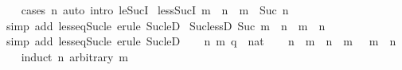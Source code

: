 \begin{isabellebody}
%
\isadelimproof
\ \ %
\endisadelimproof
%
\isatagproof
{}\isamarkupfalse%
\ {\isacharparenleft}{\kern0pt}cases\ n{\isacharparenright}{\kern0pt}\ {\isacharparenleft}{\kern0pt}auto\ intro{\isacharcolon}{\kern0pt}\ le{\isacharunderscore}{\kern0pt}SucI{\isacharparenright}{\kern0pt}%
\endisatagproof
{\isafoldproof}%
%
\isadelimproof
\isanewline
%
\endisadelimproof
\isanewline
{}\isamarkupfalse%
\ less{\isacharunderscore}{\kern0pt}SucI{\isacharcolon}{\kern0pt}\ {\isachardoublequoteopen}m\ {\isacharless}{\kern0pt}\ n\ {\isasymLongrightarrow}\ m\ {\isacharless}{\kern0pt}\ Suc\ n{\isachardoublequoteclose}\isanewline
%
\isadelimproof
\ \ %
\endisadelimproof
%
\isatagproof
{}\isamarkupfalse%
\ {\isacharparenleft}{\kern0pt}simp\ add{\isacharcolon}{\kern0pt}\ less{\isacharunderscore}{\kern0pt}eq{\isacharunderscore}{\kern0pt}Suc{\isacharunderscore}{\kern0pt}le{\isacharparenright}{\kern0pt}\ {\isacharparenleft}{\kern0pt}erule\ Suc{\isacharunderscore}{\kern0pt}leD{\isacharparenright}{\kern0pt}%
\endisatagproof
{\isafoldproof}%
%
\isadelimproof
\isanewline
%
\endisadelimproof
\isanewline
{}\isamarkupfalse%
\ Suc{\isacharunderscore}{\kern0pt}lessD{\isacharcolon}{\kern0pt}\ {\isachardoublequoteopen}Suc\ m\ {\isacharless}{\kern0pt}\ n\ {\isasymLongrightarrow}\ m\ {\isacharless}{\kern0pt}\ n{\isachardoublequoteclose}\isanewline
%
\isadelimproof
\ \ %
\endisadelimproof
%
\isatagproof
{}\isamarkupfalse%
\ {\isacharparenleft}{\kern0pt}simp\ add{\isacharcolon}{\kern0pt}\ less{\isacharunderscore}{\kern0pt}eq{\isacharunderscore}{\kern0pt}Suc{\isacharunderscore}{\kern0pt}le{\isacharparenright}{\kern0pt}\ {\isacharparenleft}{\kern0pt}erule\ Suc{\isacharunderscore}{\kern0pt}leD{\isacharparenright}{\kern0pt}%
\endisatagproof
{\isafoldproof}%
%
\isadelimproof
\isanewline
%
\endisadelimproof
\isanewline
{}\isamarkupfalse%
\isanewline
%
\isadelimproof
%
\endisadelimproof
%
\isatagproof
{}\isamarkupfalse%
\isanewline
\ \ \isamarkupfalse%
\ n\ m\ q\ {\isacharcolon}{\kern0pt}{\isacharcolon}{\kern0pt}\ nat\isanewline
\ \ \isamarkupfalse%
\ {\isachardoublequoteopen}n\ {\isacharless}{\kern0pt}\ m\ {\isasymlongleftrightarrow}\ n\ {\isasymle}\ m\ {\isasymand}\ {\isasymnot}\ m\ {\isasymle}\ n{\isachardoublequoteclose}\isanewline
\ \ \isamarkupfalse%
\ {\isacharparenleft}{\kern0pt}induct\ n\ arbitrary{\isacharcolon}{\kern0pt}\ m{\isacharparenright}{\kern0pt}\isanewline
\ \ \ \ \isamarkupfalse%
\ {}\isanewline
\ \ \ \ \isamarkupfalse%

\end{isabellebody}
